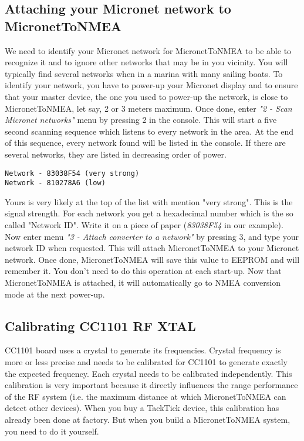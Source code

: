 \documentclass{report}
\begin{document}
\subsection{Attaching your Micronet network to MicronetToNMEA}

We need to identify your Micronet network for MicronetToNMEA to be able to recognize it and to ignore other networks that may be in you vicinity. You will typically find several networks when in a marina with many sailing boats.
To identify your network, you have to power-up your Micronet display and to ensure that your master device, the one you used to power-up the network, is close to MicronetToNMEA, let say, 2 or 3 meters maximum. Once done, enter \emph{"2 - Scan Micronet networks"} menu by pressing 2 in the console. This will start a five second scanning sequence which listens to every network in the area. At the end of this sequence, every network found will be listed in the console. If there are several networks, they are listed in decreasing order of power.

\begin{verbatim}
Network - 83038F54 (very strong)
Network - 810278A6 (low)
\end{verbatim}

Yours is very likely at the top of the list with mention "very strong". This is the signal strength. For each network you get a hexadecimal number which is the so called "Network ID". Write it on a piece of paper (\emph{83038F54} in our example).
Now enter menu \emph{"3 - Attach converter to a network"} by pressing 3, and type your network ID when requested. This will attach MicronetToNMEA to your Micronet network.
Once done, MicronetToNMEA will save this value to EEPROM and will remember it. You don't need to do this operation at each start-up. Now that MicronetToNMEA is attached, it will automatically go to NMEA conversion mode at the next power-up.

\subsection{Calibrating CC1101 RF XTAL}

CC1101 board uses a crystal to generate its frequencies. Crystal frequency is more or less precise and needs to be calibrated for CC1101 to generate exactly the expected frequency. Each crystal needs to be calibrated independently. This calibration is very important because it directly influences the range performance of the RF system (i.e. the maximum distance at which MicronetToNMEA can detect other devices). When you buy a TackTick device, this calibration has already been done at factory. But when you build a MicronetToNMEA system, you need to do it yourself.
\end{document}
